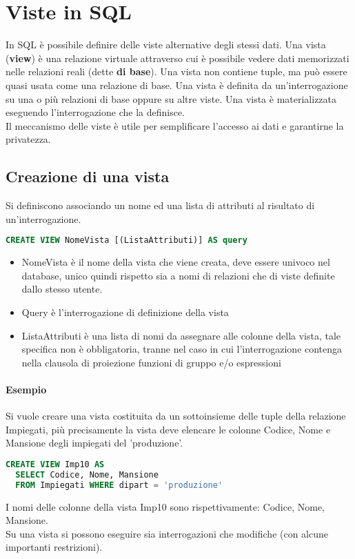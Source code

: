 \section{Viste in SQL}
In SQL è possibile definire delle viste alternative degli stessi dati.
Una vista (\textbf{view}) è una relazione virtuale attraverso cui è possibile vedere dati memorizzati
nelle relazioni reali (dette \textbf{di base}). Una vista non contiene tuple, ma può
essere quasi usata come una relazione di base. Una vista è definita da un'interrogazione su una o più
relazioni di base oppure su altre viste. Una vista è materializzata eseguendo l'interrogazione che
la definisce.\\
Il meccanismo delle viste è utile per semplificare l'accesso ai dati e garantirne la privatezza.
\subsection{Creazione di una vista}
Si definiscono associando un nome ed una lista di attributi al risultato di un'interrogazione.
\begin{lstlisting}[language=SQL]
  CREATE VIEW NomeVista [(ListaAttributi)] AS query
\end{lstlisting}
\begin{itemize}
  \item NomeVista è il nome della vista che viene creata, deve essere univoco nel database, 
  unico quindi rispetto sia a nomi di relazioni che di viste definite dallo stesso utente.
  \item Query è l'interrogazione di definizione della vista
  \item  ListaAttributi è una lista di nomi da assegnare alle colonne della vista, tale
  specifica non è obbligatoria, tranne nel caso in cui l'interrogazione contenga nella clausola di
  proiezione funzioni di gruppo e/o espressioni
\end{itemize}
\paragraph*{Esempio} Si vuole creare una vista costituita da un sottoinsieme
delle tuple della relazione Impiegati, più precisamente la vista deve
elencare le colonne Codice, Nome e Mansione degli impiegati del 'produzione'.
\begin{lstlisting}[language=SQL]
  CREATE VIEW Imp10 AS
  SELECT Codice, Nome, Mansione
  FROM Impiegati WHERE dipart = 'produzione'
\end{lstlisting}
I nomi delle colonne della vista Imp10 sono rispettivamente: Codice, Nome, Mansione.\\
Su una vista si possono eseguire sia interrogazioni che modifiche (con alcune importanti
restrizioni).
